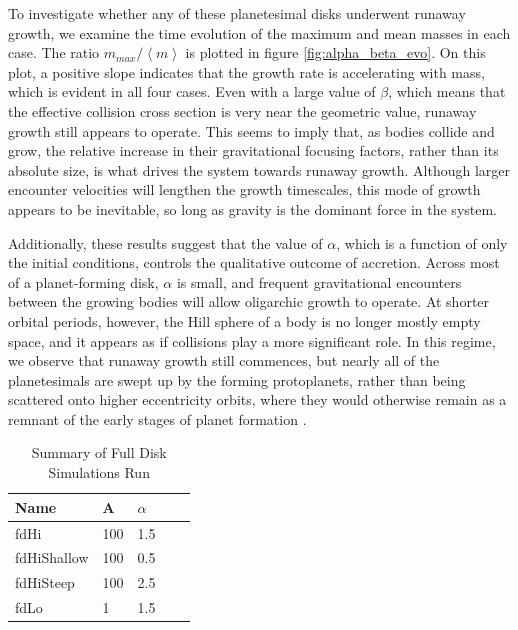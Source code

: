 \documentclass[twocolumn]{aastex63}
\begin{document}
To investigate whether any of these planetesimal disks underwent runaway growth, we examine the time evolution of the maximum and mean masses in each case. The ratio $m_{max}/\left< m \right>$ is plotted in figure \ref{fig:alpha_beta_evo}. On this plot, a positive slope indicates that the growth rate is accelerating with mass, which is evident in all four cases. Even with a large value of $\beta$, which means that the effective collision cross section is very near the geometric value, runaway growth still appears to operate. This seems to imply that, as bodies collide and grow, the relative increase in their gravitational focusing factors, rather than its absolute size, is what drives the system towards runaway growth. Although larger encounter velocities will lengthen the growth timescales, this mode of growth appears to be inevitable, so long as gravity is the dominant force in the system.

Additionally, these results suggest that the value of $\alpha$, which is a function of only the initial conditions, controls the qualitative outcome of accretion. Across most of a planet-forming disk, $\alpha$ is small, and frequent gravitational encounters between the growing bodies will allow oligarchic growth to operate. At shorter orbital periods, however, the Hill sphere of a body is no longer mostly empty space, and it appears as if collisions play a more significant role. In this regime, we observe that runaway growth still commences, but nearly all of the planetesimals are swept up by the forming protoplanets, rather than being scattered onto higher eccentricity orbits, where they would otherwise remain as a remnant of the early stages of planet formation \citep{kokubo98, kokubo00}.

\begin{table}
\begin{center}
\caption{Summary of Full Disk Simulations Run}
\begin{tabular}{lllll} \hline \hline
Name     & A & $\alpha$ &  &  \\ \hline
fdHi                 & 100                                                         & 1.5                              &  &  \\
fdHiShallow     & 100                                                        & 0.5                              &  &  \\
fdHiSteep       & 100                                                         & 2.5                              &  &  \\
fdLo                & 1                                                             & 1.5                              &  &  \\ \hline
\end{tabular}
\label{tab:sims}
\end{center}
\end{table}
\end{document}
